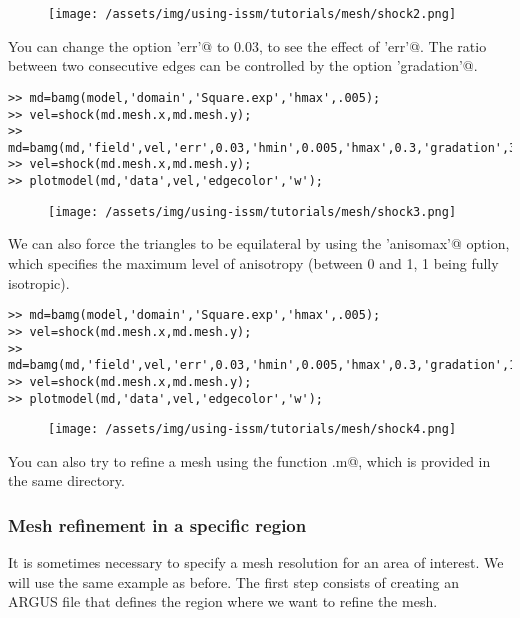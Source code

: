 \begin{figure}[H]
	\begin{center}
		\texttt{[image: /assets/img/using-issm/tutorials/mesh/shock2.png]}
	\end{center}
\end{figure}
You can change the option \verb@'err'@ to 0.03, to see the effect of \verb@'err'@. The ratio between two consecutive edges can be controlled by the option \verb@'gradation'@.
\begin{verbatim}>> md=bamg(model,'domain','Square.exp','hmax',.005);
>> vel=shock(md.mesh.x,md.mesh.y);
>> md=bamg(md,'field',vel,'err',0.03,'hmin',0.005,'hmax',0.3,'gradation',3);
>> vel=shock(md.mesh.x,md.mesh.y);
>> plotmodel(md,'data',vel,'edgecolor','w');
\end{verbatim}
\begin{figure}[H]
	\begin{center}
		\texttt{[image: /assets/img/using-issm/tutorials/mesh/shock3.png]}
	\end{center}
\end{figure}
We can also force the triangles to be equilateral by using the \verb@'anisomax'@ option, which specifies the maximum level of anisotropy (between 0 and 1, 1 being fully isotropic).
\begin{verbatim}>> md=bamg(model,'domain','Square.exp','hmax',.005);
>> vel=shock(md.mesh.x,md.mesh.y);
>> md=bamg(md,'field',vel,'err',0.03,'hmin',0.005,'hmax',0.3,'gradation',1.3,'anisomax',1);
>> vel=shock(md.mesh.x,md.mesh.y);
>> plotmodel(md,'data',vel,'edgecolor','w');
\end{verbatim}
\begin{figure}[H]
	\begin{center}
		\texttt{[image: /assets/img/using-issm/tutorials/mesh/shock4.png]}
	\end{center}
\end{figure}
You can also try to refine a mesh using the function \verb@circles.m@, which is provided in the same directory.
\subsubsection{Mesh refinement in a specific region}%
It is sometimes necessary to specify a mesh resolution for an area of interest. We will use the same example as before. The first step consists of creating an ARGUS file that defines the region where we want to refine the mesh.

